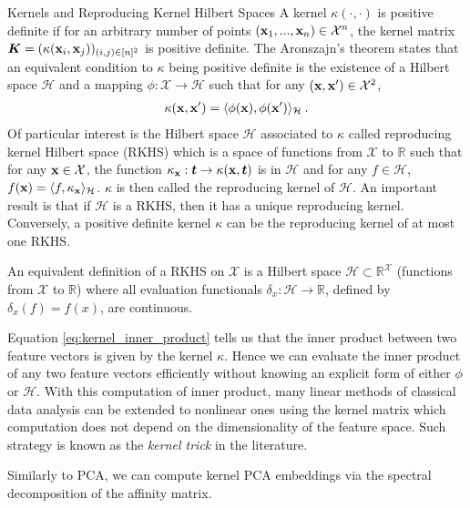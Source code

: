 \begin{mem1}{Kernels and Reproducing Kernel Hilbert Spaces}\label{mem:kernels}
	A kernel $\kappa(\cdot, \cdot)$ is positive definite if for an arbitrary number of points $({\mathbf{x}}_1, ..., {\mathbf{x}}_n) \in \mathcal{X}^n$, the kernel matrix $\bm{K} = (\kappa({\mathbf{x}}_i, {\mathbf{x}}_j))_{(i,j) \in [n]^2}$ is positive definite. The Aronszajn's theorem \citep{aronszajn1950theory} states that an equivalent condition to $\kappa$ being positive definite is the existence of a Hilbert space $\mathcal{H}$ and a mapping $\phi : \mathcal{X} \to \mathcal{H}$ such that for any $({\mathbf{x}}, {\mathbf{x}}') \in \mathcal{X}^2$,
\begin{align}\label{eq:kernel_inner_product}
    \kappa({\mathbf{x}}, {\mathbf{x}}') = \langle \phi({\mathbf{x}}), \phi({\mathbf{x}}') \rangle_{\mathcal{H}} \:.
\end{align}
Of particular interest is the Hilbert space $\mathcal{H}$ associated to $\kappa$ called reproducing kernel Hilbert space (RKHS) which is a space of functions from $\mathcal{X}$ to $\mathbb{R}$ such that for any ${\mathbf{x}} \in \mathcal{X}$, the function $\kappa_{{\mathbf{x}}} : \bm{t} \to \kappa({\mathbf{x}}, \bm{t})$ is in $\mathcal{H}$ and for any $f \in \mathcal{H}$, $f({\mathbf{x}}) = \langle f, \kappa_{{\mathbf{x}}} \rangle_{\mathcal{H}}$. $\kappa$ is then called the reproducing kernel of $\mathcal{H}$. An important result is that if $\mathcal{H}$ is a RKHS, then it has a unique reproducing kernel. Conversely, a positive definite kernel $\kappa$ can be the reproducing kernel of at most one RKHS.

An equivalent definition of a RKHS on $\mathcal{X}$ is a Hilbert
space $\mathcal{H} \subset \mathbb{R}^{\mathcal{X}}$ (functions from $\mathcal{X}$ to $\mathbb{R}$) where all evaluation functionals $\delta_x : \mathcal{H} \to \mathbb{R}$,
defined by $\delta_x(f) = f(x)$, are continuous.

Equation \ref{eq:kernel_inner_product} tells us that the inner product between two feature vectors is given by the kernel $\kappa$. Hence we can evaluate the inner product of any two feature vectors efficiently without knowing an explicit form of either $\phi$ or $\mathcal{H}$. With this computation of inner product, many linear methods of classical data analysis can be extended to nonlinear ones using the kernel matrix which computation does not depend on the dimensionality of the feature space. Such strategy is known as the \textit{kernel trick} in the literature.
\end{mem1}

Similarly to PCA, we can compute kernel PCA embeddings via the spectral decomposition of the affinity matrix.

